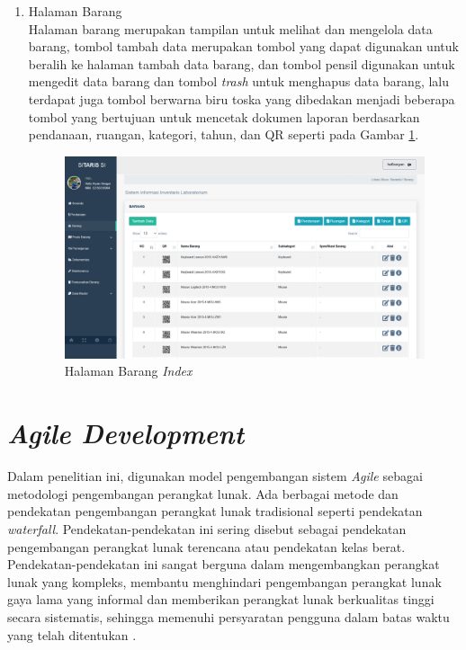 \begin{enumerate}
	\item Halaman Barang \\ Halaman barang merupakan tampilan untuk melihat dan mengelola data barang, tombol tambah data merupakan tombol yang dapat digunakan untuk beralih ke halaman tambah data barang, dan tombol pensil digunakan untuk mengedit data barang dan tombol \textit{trash} untuk menghapus data barang, lalu terdapat juga tombol berwarna biru toska yang dibedakan menjadi beberapa tombol yang bertujuan untuk mencetak dokumen laporan berdasarkan pendanaan, ruangan, kategori, tahun, dan QR seperti pada Gambar \ref{fig:sitaris-barang}.

	      \begin{figure}[h]
		      \centering
		      \includegraphics[width=1\linewidth]{konten//gambar/barang.png}
		      \caption{Halaman Barang \textit{Index}}
		      \label{fig:sitaris-barang}
	      \end{figure}

\end{enumerate}

\section{\textit{Agile Development}}
Dalam penelitian ini, digunakan model pengembangan sistem \textit{Agile} sebagai metodologi pengembangan perangkat lunak. Ada berbagai metode dan pendekatan pengembangan perangkat lunak tradisional seperti pendekatan \textit{waterfall}. Pendekatan-pendekatan ini sering disebut sebagai pendekatan pengembangan perangkat lunak terencana atau pendekatan kelas berat. Pendekatan-pendekatan ini sangat berguna dalam mengembangkan perangkat lunak yang kompleks, membantu menghindari pengembangan perangkat lunak gaya lama yang informal dan memberikan perangkat lunak berkualitas tinggi secara sistematis, sehingga memenuhi persyaratan pengguna dalam batas waktu yang telah ditentukan \cite{al2020agile}.

